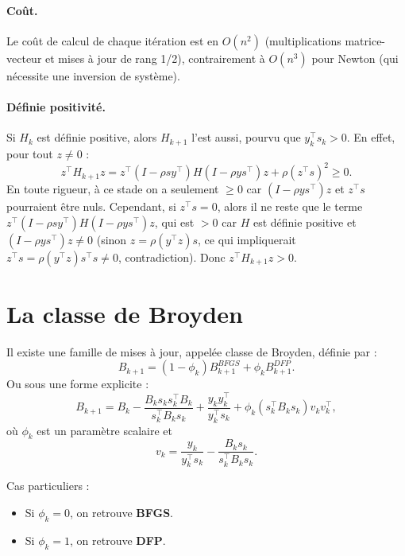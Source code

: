 \paragraph{Coût.} Le coût de calcul de chaque itération est en $O(n^2)$ (multiplications matrice-vecteur et mises à jour de rang 1/2), contrairement à $O(n^3)$ pour Newton (qui nécessite une inversion de système).

\paragraph{Définie positivité.}
Si $H_k$ est définie positive, alors $H_{k+1}$ l'est aussi, pourvu que $y_k^\top s_k > 0$.
En effet, pour tout $z \neq 0$ :
\[
    z^\top H_{k+1} z = z^\top (I - \rho s y^\top) H (I - \rho y s^\top) z + \rho (z^\top s)^2 \geq 0.
\]
En toute rigueur, à ce stade on a seulement $\geq 0$ car $(I - \rho y s^\top) z$ et $z^\top s$ pourraient être nuls. Cependant, si $z^\top s = 0$, alors il ne reste que le terme $z^\top (I - \rho s y^\top) H (I - \rho y s^\top) z$, qui est $> 0$ car $H$ est définie positive et $(I - \rho y s^\top) z \neq 0$ (sinon $z = \rho (y^\top z) s$, ce qui impliquerait $z^\top s = \rho (y^\top z) s^\top s \neq 0$, contradiction). Donc $z^\top H_{k+1} z > 0$.

\section{La classe de Broyden}

Il existe une famille de mises à jour, appelée classe de Broyden, définie par :
\begin{equation}
    B_{k+1} = (1-\phi_k) B_{k+1}^{BFGS} + \phi_k B_{k+1}^{DFP}.
\end{equation}
Ou sous une forme explicite :
\begin{equation}
    B_{k+1} = B_k - \frac{B_k s_k s_k^\top B_k}{s_k^\top B_k s_k} + \frac{y_k y_k^\top}{y_k^\top s_k} + \phi_k (s_k^\top B_k s_k) v_k v_k^\top,
\end{equation}
où $\phi_k$ est un paramètre scalaire et
\[
    v_k = \frac{y_k}{y_k^\top s_k} - \frac{B_k s_k}{s_k^\top B_k s_k}.
\]

Cas particuliers :
\begin{itemize}
    \item Si $\phi_k = 0$, on retrouve \textbf{BFGS}.
    \item Si $\phi_k = 1$, on retrouve \textbf{DFP}.
\end{itemize}

